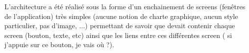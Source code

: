 L'architecture a été réalisé sous la forme d'un enchainement de screens (fenêtres de l'application) très simples (aucune notion de charte graphique, aucun style particulier, pas d'image, ...) permettant de savoir que devait contenir chaque screen (bouton, texte, etc) ainsi que les liens entre ces différentes screen (\og{} si j'appuie sur ce bouton, je vais où ?\fg{}).